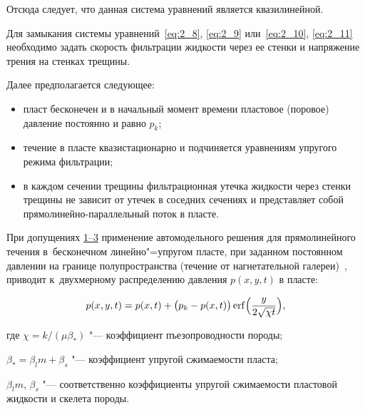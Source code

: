 Отсюда следует, что данная система уравнений является квазилинейной. 



Для замыкания системы уравнений~\eqref{eq:2_8}, \eqref{eq:2_9} или~\eqref{eq:2_10}, \eqref{eq:2_11} необходимо задать скорость фильтрации жидкости через ее стенки и напряжение трения на стенках трещины.



Далее предполагается следующее: \hypertarget{bulg:predp1-3}{}

\begin{itemize}

\item[1)] пласт бесконечен и в начальный момент времени пластовое (поровое) давление постоянно и равно $p_k$; 

\item[2)] течение в пласте квазистационарно и подчиняется уравнениям упругого режима фильтрации; 

\item[3)] в каждом сечении трещины фильтрационная утечка жидкости через стенки трещины не зависит от утечек в соседних сечениях и представляет собой прямолинейно-параллельный поток в пласте.



\end{itemize}

 

  При допущениях \hyperlink{bulg:predp1-3}{1–3} применение автомодельного решения для прямолинейного течения в~бесконечном линейно"=упругом пласте, при заданном постоянном давлении на границе полупространства (течение от нагнетательной галереи)~\cite{Basn1}, приводит к~двухмерному распределению давления $p(x, y, t)$ в пласте:

\begin{equation}

p(x, y, t) = p (x, t) + \bigl(p_k - p (x, t)\bigr) \mathop{\rm erf} \Bigl(\frac{y}{2 \sqrt{\chi t}}\Bigr) , \label{eq:2_12}

\end{equation}

где $\chi = {k}/({\mu \beta_*})$ "--- коэффициент пъезопроводности породы; 

$\beta_* = \beta_l m + \beta_s$ "--- коэффициент упругой сжимаемости пласта; 

$\beta_l m$, $\beta_s$ "--- соответственно коэффициенты упругой сжимаемости пластовой жидкости и скелета породы.



